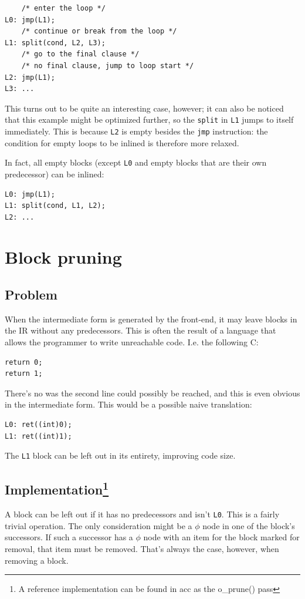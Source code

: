 \documentclass[12pt, a4paper]{article}
\begin{document}
\begin{lstlisting}
	/* enter the loop */
L0:	jmp(L1);
	/* continue or break from the loop */
L1:	split(cond, L2, L3);
	/* go to the final clause */
	/* no final clause, jump to loop start */
L2:	jmp(L1);
L3:	...
\end{lstlisting}

This turns out to be quite an interesting case, however; it can also be noticed
that this example might be optimized further, so the \verb+split+ in \verb+L1+
jumps to itself immediately. This is because \verb+L2+ is empty besides the \verb+jmp+
instruction: the condition for empty loops to be inlined is therefore more relaxed.

In fact, all empty blocks (except \verb+L0+ and empty blocks that are their own predecessor) can be inlined:

\begin{lstlisting}
L0:	jmp(L1);
L1:	split(cond, L1, L2);
L2:	...
\end{lstlisting}

\section{Block pruning}
\label{sec:prune}
\subsection{Problem}
When the intermediate form is generated by the front-end, it may leave blocks in
the IR without any predecessors. This is often the result of a language that
allows the programmer to write unreachable code. I.e. the following C:

\begin{lstlisting}
return 0;
return 1;
\end{lstlisting}

There's no was the second line could possibly be reached, and this is even obvious
in the intermediate form. This would be a possible naive translation:

\begin{lstlisting}
L0:	ret((int)0);
L1:	ret((int)1);
\end{lstlisting}

The \verb+L1+ block can be left out in its entirety, improving code size.

\subsection[Implementation]{Implementation\footnote{A reference implementation
can be found in acc as the o\_prune() pass} }
A block can be left out if it has no predecessors and isn't \verb+L0+.
This is a fairly trivial operation. The only consideration might be a $\phi$
node in one of the block's successors. If such a successor has a $\phi$ node with
an item for the block marked for removal, that item must be removed. That's
always the case, however, when removing a block.
\end{document}
